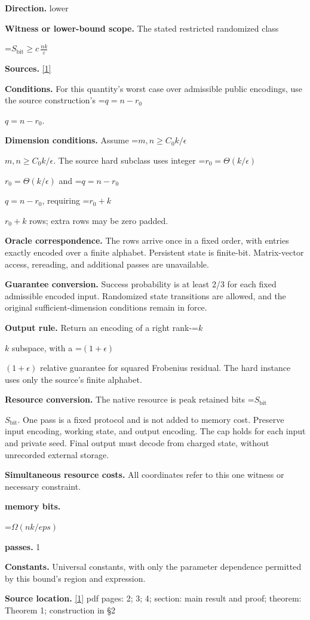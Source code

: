 \documentclass[10pt,a4paper]{article}
\newcommand{\AtlasMath}[1]{\par\begingroup\centering\setbox0=\hbox{$\displaystyle #1$}\ifdim\wd0>1.4\linewidth\typeout{ATLAS WIDE FORMULA: \the\wd0}\fi\ifdim\wd0>\linewidth\resizebox{\linewidth}{!}{\box0}\else\box0\fi\par\endgroup}
\newcommand{\AtlasInlineMath}[1]{\begingroup\setbox0=\hbox{$#1$}\ifdim\wd0>.4\linewidth\endgroup\AtlasMath{#1}\else\endgroup$#1$\fi}
\begin{document}
\textbf{Direction.} lower

\textbf{Witness or lower-bound scope.} The stated restricted randomized class

\AtlasMath{S_{\mathrm{bit}}\ge c\,\frac{nk}{\varepsilon}}
\textbf{Sources.} \href{https://papers.neurips.cc/paper/5407-low-rank-approximation-lower-bounds-in-row-update-streams.pdf}{[1]}

\textbf{Conditions.} For this quantity's worst case over admissible public encodings, use the source construction's \AtlasInlineMath{q=n-r_0}.

\textbf{Dimension conditions.} Assume \AtlasInlineMath{m,n\ge C_0k/\epsilon}. The source hard subclass uses integer \AtlasInlineMath{r_0=\Theta(k/\epsilon)} and \AtlasInlineMath{q=n-r_0}, requiring \AtlasInlineMath{r_0+k} rows; extra rows may be zero padded.

\textbf{Oracle correspondence.} The rows arrive once in a fixed order, with entries exactly encoded over a finite alphabet. Persistent state is finite-bit. Matrix-vector access, rereading, and additional passes are unavailable.

\textbf{Guarantee conversion.} Success probability is at least 2/3 for each fixed admissible encoded input. Randomized state transitions are allowed, and the original sufficient-dimension conditions remain in force.

\textbf{Output rule.} Return an encoding of a right rank-\AtlasInlineMath{k} subspace, with a \AtlasInlineMath{(1+\epsilon)} relative guarantee for squared Frobenius residual. The hard instance uses only the source's finite alphabet.

\textbf{Resource conversion.} The native resource is peak retained bits \AtlasInlineMath{S_{\mathrm{bit}}}. One pass is a fixed protocol and is not added to memory cost. Preserve input encoding, working state, and output encoding. The cap holds for each input and private seed. Final output must decode from charged state, without unrecorded external storage.

\textbf{Simultaneous resource costs.} All coordinates refer to this one witness or necessary constraint.

\textbf{memory bits.}

\AtlasMath{\Omega (nk/eps)}
\textbf{passes.} 1

\textbf{Constants.} Universal constants, with only the parameter dependence permitted by this bound’s region and expression.

\textbf{Source location.} \href{https://papers.neurips.cc/paper/5407-low-rank-approximation-lower-bounds-in-row-update-streams.pdf}{[1]} pdf pages: 2; 3; 4; section: main result and proof; theorem: Theorem 1; construction in §2
\end{document}
